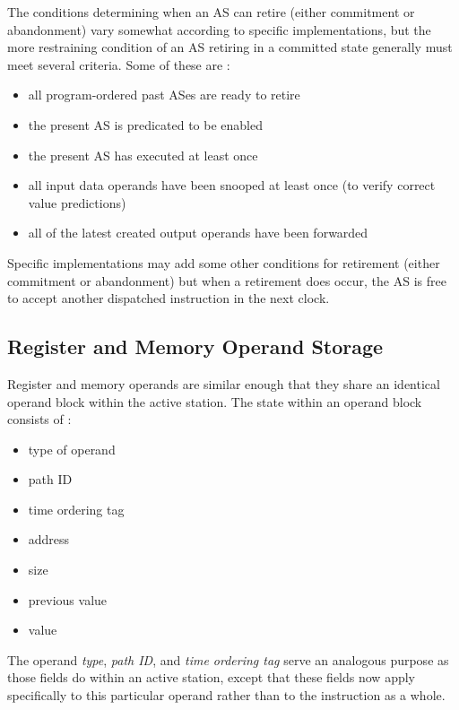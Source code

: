 \documentclass{book}
\begin{document}
The conditions determining when an AS can retire 
(either commitment or abandonment) vary somewhat according
to specific implementations, but the more restraining
condition of an AS retiring in a committed state generally
must meet several criteria.  Some of these are :
%
\begin{itemize}
\vspace{-0.10in}
\item{all program-ordered past ASes are ready to retire}
\vspace{-0.10in}
\item{the present AS is predicated to be enabled}
\vspace{-0.10in}
\item{the present AS has executed at least once}
\vspace{-0.10in}
\item{all input data operands have been snooped at least once 
(to verify correct value predictions)}
\vspace{-0.10in}
\item{all of the latest created output operands have been forwarded}
\vspace{-0.10in}
\end{itemize}   
%
Specific implementations may add some other conditions
for retirement (either commitment or abandonment)
but when a retirement does occur, the AS is free to
accept another dispatched instruction in the next clock.
%
%
\subsection{Register and Memory Operand Storage}
%
Register and memory operands are similar enough that
they share an identical operand block within the active station.
The state within an operand block consists of :
%
\begin{itemize}
\vspace{-0.10in}
\item{type of operand}
\vspace{-0.10in}
\item{path ID}
\vspace{-0.10in}
\item{time ordering tag}
\vspace{-0.10in}
\item{address}
\vspace{-0.10in}
\item{size}
\vspace{-0.10in}
\item{previous value}
\vspace{-0.10in}
\item{value}
\vspace{-0.10in}
\end{itemize}   
%
The operand \textit{type}, \textit{path ID}, and \textit{time ordering tag}
serve
an analogous purpose as those fields do within an active station,
except that these fields now apply specifically to this particular
operand rather than to the instruction as a whole.
\end{document}
